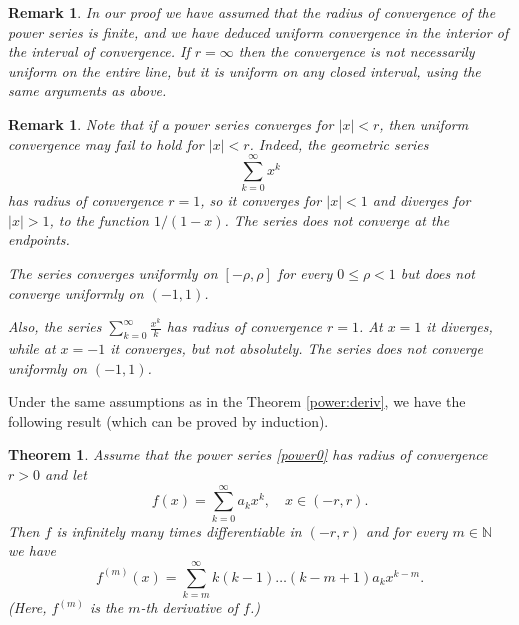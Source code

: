 \documentclass[a4paper,reqno]{amsart}
\numberwithin{equation}{section}
\newtheorem{theorem}[definition]{Theorem}
\newtheorem{remark}[definition]{Remark}
\def\N{\mathbb{N}}
\begin{document}
\begin{remark}
In our proof we have assumed that the radius of convergence of the power series is finite, and we have deduced uniform convergence in the interior of the interval of convergence. If $r=\infty$ then the convergence is not 
necessarily uniform on the entire line, but it is uniform on any closed interval, using the same arguments as above.
\end{remark}

\begin{remark}
Note that if a power series converges for $|x|<r$, then uniform convergence may fail to hold for $|x|<r$. Indeed, the geometric series
$$
\sum_{k=0}^\infty x^k
$$
has radius of convergence $r=1$, so it converges for $|x|<1$ and diverges for $|x|>1$, to the function $1/(1-x)$. The series does not converge at the endpoints.

The series converges uniformly on $[-\rho, \rho]$ for every $0\leq \rho<1$ but does not converge uniformly on $(-1,1)$.

\medskip


Also, the series $\sum_{k=0}^\infty \frac{x^k}{k}$ has radius of convergence $r=1$. At $x=1$ it diverges, while at $x=-1$ it converges, but not absolutely. The series does not converge uniformly on $(-1,1)$.



\end{remark}


Under the same assumptions as in the Theorem \ref{power:deriv}, we have the following result (which can be proved by induction).

\begin{theorem}
Assume that the power series \eqref{power0} has radius of convergence $r>0$ and let 
$$
f(x) = \sum_{k=0}^\infty a_k x^k, \quad x\in (-r,r).
$$
Then $f$ is infinitely many times differentiable in $(-r,r)$ and for every $m\in \N$ we have 
\begin{equation}\label{Taylor}
f^{(m)}(x) = \sum_{k=m}^\infty k(k-1)\dots(k-m+1)a_kx^{k-m}.
\end{equation}
(Here, $f^{(m)}$ is the $m$-th derivative of $f$.)
\end{theorem}
\end{document}
